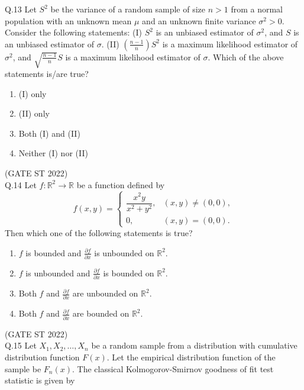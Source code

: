 \documentclass[journal,12pt,onecolumn]{IEEEtran}
\theoremstyle{remark}
\begin{document}
	\vspace{2em}
Q.13 Let $S^2$ be the variance of a random sample of size $n > 1$ from a normal population with an unknown mean $\mu$ and an unknown finite variance $\sigma^2 > 0$. Consider the following statements:
(I) $S^2$ is an unbiased estimator of $\sigma^2$, and $S$ is an unbiased estimator of $\sigma$.
(II) $(\frac{n-1}{n})S^2$ is a maximum likelihood estimator of $\sigma^2$, and $\sqrt{\frac{n-1}{n}}S$ is a maximum likelihood estimator of $\sigma$.
Which of the above statements is/are true?
\begin{multicols}{4}
\begin{enumerate}[label=\alph*.] 
	\item (I) only
	\item (II) only
	\item Both (I) and (II)
	\item Neither (I) nor (II)
	
\end{enumerate}
\end{multicols}
\hfill (GATE ST 2022)\\
	\vspace{2em}
Q.14 Let $f : \mathbb{R}^2 \to \mathbb{R}$ be a function defined by
\[
f(x,y) =
\begin{cases}
	\dfrac{x^2y}{x^2 + y^2}, & (x,y) \neq (0,0), \\[6pt]
	0, & (x,y) = (0,0).
\end{cases}
\]
Then which one of the following statements is true?
\begin{multicols}{2}
\begin{enumerate}[label=\alph*.] 
	\item $f$ is bounded and $\frac{\partial f}{\partial x}$ is unbounded on $\mathbb{R}^2$.
	\item $f$ is unbounded and $\frac{\partial f}{\partial x}$ is bounded on $\mathbb{R}^2$.
	\item Both $f$ and $\frac{\partial f}{\partial x}$ are unbounded on $\mathbb{R}^2$.
	\item Both $f$ and $\frac{\partial f}{\partial x}$ are bounded on $\mathbb{R}^2$.
	
\end{enumerate}
\end{multicols}
\hfill (GATE ST 2022)\\
	\vspace{2em}
Q.15 Let $X_1, X_2, \dots, X_n$ be a random sample from a distribution with cumulative distribution function $F(x)$. Let the empirical distribution function of the sample be $F_n(x)$. The classical Kolmogorov-Smirnov goodness of fit test statistic is given by
\end{document}
